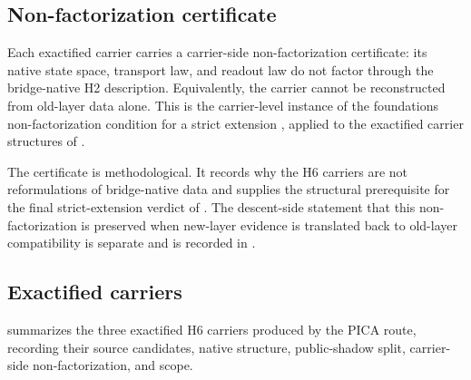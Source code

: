 \documentclass[11pt]{article}
\newcommand{\OldLayer}{H2}
\newcommand{\NewLayer}{H6}
\theoremstyle{definition}
\begin{document}
\subsection{Non-factorization certificate}\label{subsec:non-factorization-certificate}

Each exactified carrier carries a carrier-side non-factorization certificate:
its native state space, transport law, and readout law do not factor through the
bridge-native \OldLayer{} description.  Equivalently, the carrier cannot be
reconstructed from old-layer data alone.  This is the carrier-level instance of
the foundations non-factorization condition for a strict extension
\cite{Tsiokos2026FoundationsII}, applied to the exactified carrier structures
of \cite{Tsiokos2026CarrierExactification}.

The certificate is methodological.  It records why the \NewLayer{} carriers are
not reformulations of bridge-native data and supplies the structural
prerequisite for the final strict-extension verdict of .
The descent-side statement that this non-factorization is preserved when
new-layer evidence is translated back to old-layer compatibility is separate
and is recorded in .

\subsection{Exactified carriers}\label{subsec:exactified-carriers-table}

 summarizes the three exactified \NewLayer{}
carriers produced by the PICA route, recording their source candidates, native
structure, public-shadow split, carrier-side non-factorization, and scope.
\end{document}

